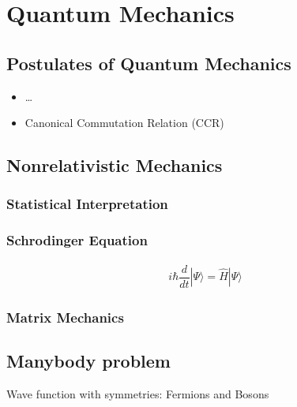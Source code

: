 \documentclass[letterpaper,10pt,italian]{jupyterBook}
\begin{document}
\chapter{Quantum Mechanics}
\label{\detokenize{ch/quantum-mechanics:quantum-mechanics}}\label{\detokenize{ch/quantum-mechanics:id1}}\label{\detokenize{ch/quantum-mechanics::doc}}

\section{Postulates of Quantum Mechanics}
\label{\detokenize{ch/quantum-mechanics:postulates-of-quantum-mechanics}}\begin{itemize}
\item {} 
\sphinxAtStartPar
…

\item {} 
\sphinxAtStartPar
Canonical Commutation Relation (CCR) 

\end{itemize}


\section{Non\sphinxhyphen{}relativistic Mechanics}
\label{\detokenize{ch/quantum-mechanics:non-relativistic-mechanics}}

\subsection{Statistical Interpretation}
\label{\detokenize{ch/quantum-mechanics:statistical-interpretation}}

\subsection{Schrodinger Equation}
\label{\detokenize{ch/quantum-mechanics:schrodinger-equation}}\begin{equation*}
\begin{split}i \hbar \dfrac{d}{dt} | \Psi \rangle = \hat{H} | \Psi \rangle \end{split}
\end{equation*}

\subsection{Matrix Mechanics}
\label{\detokenize{ch/quantum-mechanics:matrix-mechanics}}

\section{Many\sphinxhyphen{}body problem}
\label{\detokenize{ch/quantum-mechanics:many-body-problem}}
\sphinxAtStartPar
Wave function with symmetries: Fermions and Bosons







\renewcommand{\indexname}{Indice}
\printindex
\end{document}
